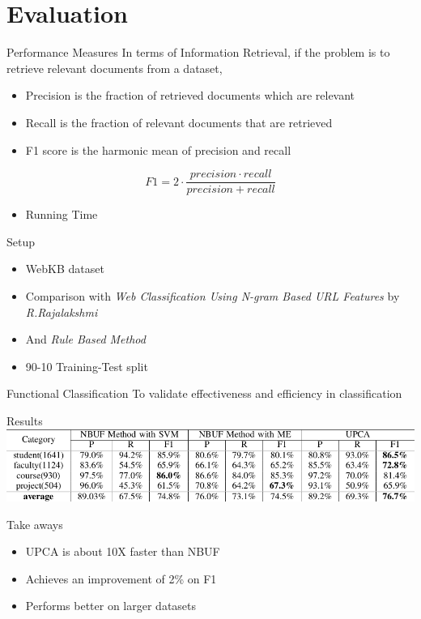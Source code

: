 \documentclass[presentation]{beamer}
\begin{document}
\section{Evaluation}
\label{sec:orgheadline25}
\begin{frame}[label={sec:orgheadline21}]{Performance Measures}
In terms of Information Retrieval, if the problem is to retrieve relevant documents from a dataset,
\begin{itemize}
\item \alert{Precision} is the fraction of retrieved documents which are relevant
\item \alert{Recall} is the fraction of relevant documents that are retrieved
\item \alert{F1 score} is the harmonic mean of \alert{precision} and \alert{recall}
\end{itemize}
\begin{equation}
F1 = 2 \cdot{} \frac{precision \cdot recall}{precision + recall}
\end{equation}
\begin{itemize}
\item Running Time
\end{itemize}
\end{frame}

\begin{frame}[label={sec:orgheadline22}]{Setup}
\begin{itemize}
\item WebKB dataset
\item Comparison with \emph{Web Classification Using N-gram Based URL Features} by \emph{R.Rajalakshmi}
\item And \emph{Rule Based Method}
\item 90-10 Training-Test split
\end{itemize}
\end{frame}

\begin{frame}[label={sec:orgheadline23}]{Functional Classification}
To validate effectiveness and efficiency in classification
\begin{block}{Results}
\includegraphics[width=.9\linewidth]{./fcl.png}
\end{block}
\begin{block}{Take aways}
\begin{itemize}
\item UPCA is about 10X faster than NBUF
\item Achieves an improvement of 2\% on F1
\item Performs better on larger datasets
\end{itemize}
\end{block}
\end{frame}
\end{document}
